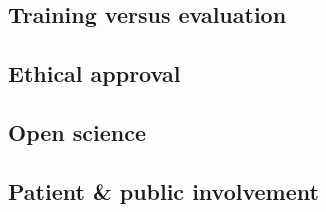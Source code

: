 \documentclass{article}
\begin{document}
\subsection{Training versus evaluation}\label{sec:training_versus_evaluation}

\subsection{Ethical approval}\label{sec:ethical_approval}

\subsection{Open science}\label{sec:open_science}






\subsection{Patient \& public involvement}\label{sec:patient_and_public_involvement}

\end{document}
